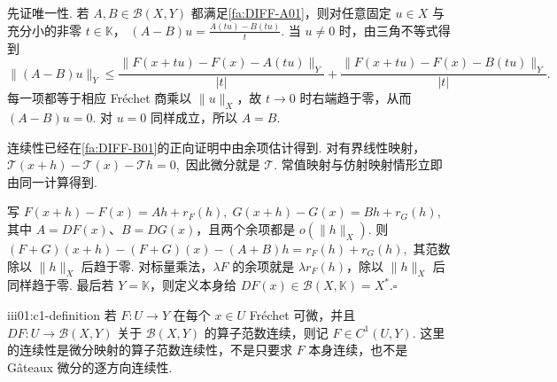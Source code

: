 \begin{FAProof}
先证唯一性. 若 \(\displaystyle A,B\in\mathcal B(X,Y)\) 都满足\autoref{fa:DIFF-A01}，则对任意固定 \(\displaystyle u\in X\) 与充分小的非零 \(\displaystyle t\in\mathbb K\)，
\(\displaystyle (A-B)u = \frac{A(tu)-B(tu)}{t}.\)
当 \(\displaystyle u\neq0\) 时，由三角不等式得到
\[
\|(A-B)u\|_Y
\leqslant
\frac{\|F(x+tu)-F(x)-A(tu)\|_Y}{|t|}
+
\frac{\|F(x+tu)-F(x)-B(tu)\|_Y}{|t|}.
\]
每一项都等于相应 Fréchet 商乘以 \(\displaystyle\|u\|_X\)，故 \(\displaystyle t\to0\) 时右端趋于零，从而 \(\displaystyle(A-B)u=0\). 对 \(\displaystyle u=0\) 同样成立，所以 \(\displaystyle A=B\).

连续性已经在\autoref{fa:DIFF-B01}的正向证明中由余项估计得到. 对有界线性映射，
\(\displaystyle \mathcal T(x+h)-\mathcal T(x)-\mathcal Th=0,\)
因此微分就是 \(\displaystyle\mathcal T\). 常值映射与仿射映射情形立即由同一计算得到.

写
\(\displaystyle F(x+h)-F(x)=Ah+r_F(h), \; G(x+h)-G(x)=Bh+r_G(h),\)
其中 \(\displaystyle A=DF(x)\)、\(\displaystyle B=DG(x)\)，且两个余项都是 \(\displaystyle o(\|h\|_X)\). 则
\(\displaystyle (F+G)(x+h)-(F+G)(x)-(A+B)h = r_F(h)+r_G(h),\)
其范数除以 \(\displaystyle\|h\|_X\) 后趋于零. 对标量乘法，\(\displaystyle\lambda F\) 的余项就是 \(\displaystyle\lambda r_F(h)\)，除以 \(\displaystyle\|h\|_X\) 后同样趋于零. 最后若 \(\displaystyle Y=\mathbb K\)，则定义本身给 \(\displaystyle DF(x)\in\mathcal B(X,\mathbb K)=X^*\).\hfill\(\square\)
\end{FAProof}

\begin{FADefinition}{iii01:c1-definition}
若 \(\displaystyle F:U\to Y\) 在每个 \(\displaystyle x\in U\) Fréchet 可微，并且
\(\displaystyle DF:U\to\mathcal B(X,Y)\)
关于 \(\displaystyle\mathcal B(X,Y)\) 的算子范数连续，则记 \(\displaystyle F\in C^1(U,Y)\). 这里的连续性是微分映射的算子范数连续性，不是只要求 \(\displaystyle F\) 本身连续，也不是 Gâteaux 微分的逐方向连续性.
\end{FADefinition}

